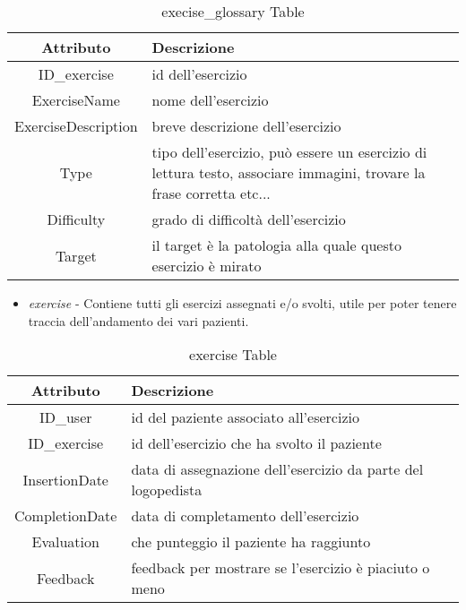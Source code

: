 \documentclass{article}
\begin{document}
    \begin{table}[h]
        \centering

        \begin{tabular}{|c|p{8cm}|}
            \hline
            \textbf{Attributo} & \textbf{Descrizione} \\
            \hline
                ID\_exercise & id dell'esercizio\\
            \hline
                ExerciseName & nome dell'esercizio\\
            \hline
                ExerciseDescription & breve descrizione dell'esercizio\\
            \hline
                Type & tipo dell'esercizio, può essere un esercizio di lettura testo, associare immagini, trovare la frase corretta etc...\\
            \hline
                Difficulty & grado di difficoltà dell'esercizio\\
            \hline
                Target & il target è la patologia alla quale questo esercizio è mirato\\
            \hline
        \end{tabular}
        \caption{execise\_glossary Table}
    \end{table}


\begin{itemize}
\item    \textit{exercise} - Contiene tutti gli esercizi assegnati e/o svolti, utile per poter tenere traccia dell'andamento dei vari pazienti.
\end{itemize}

    \begin{table}[h]
        \centering

        \begin{tabular}{|c|p{8cm}|}
            \hline
                \textbf{Attributo} & \textbf{Descrizione} \\
            \hline
                ID\_user & id del paziente associato all'esercizio\\
            \hline
                ID\_exercise & id dell'esercizio che ha svolto il paziente\\
            \hline
                InsertionDate & data di assegnazione dell'esercizio da parte del logopedista\\
            \hline
                CompletionDate & data di completamento dell'esercizio\\
            \hline
                Evaluation & che punteggio il paziente ha raggiunto\\
            \hline
                Feedback & feedback per mostrare se l'esercizio è piaciuto o meno\\
            \hline
        \end{tabular}
        \caption{exercise Table}
    \end{table}
\end{document}
